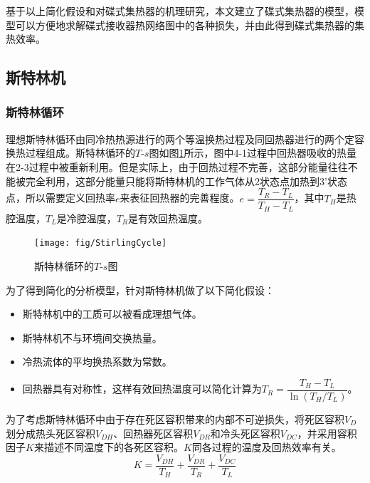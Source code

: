 基于以上简化假设和对碟式集热器的机理研究，本文建立了碟式集热器的模型，模型可以方便地求解碟式接收器热网络图中的各种损失，并由此得到碟式集热器的集热效率。

\subsection{斯特林机}
\label{sec:StirlingEngineModel}
\subsubsection{斯特林循环}
理想斯特林循环由同冷热热源进行的两个等温换热过程及同回热器进行的两个定容换热过程组成。斯特林循环的$T$-$s$图如图\ref{fig:StirlingCycle}所示，图中4-1过程中回热器吸收的热量在2-3过程中被重新利用。但是实际上，由于回热过程不完善，这部分能量往往不能被完全利用，这部分能量只能将斯特林机的工作气体从2状态点加热到3'状态点，所以需要定义回热率$e$来表征回热器的完善程度\cite{Formosa2010,Juhasz2010}。$e=\dfrac{T_R-T_L}{T_H-T_L}$，其中$T_H$是热腔温度，$T_L$是冷腔温度，$T_R$是有效回热温度。

\noindent \begin{figure}[htbp]
\begin{center}
	\texttt{[image: fig/StirlingCycle]}
	\caption{斯特林循环的$T$-$s$图}
	\label{fig:StirlingCycle}
\end{center}
\end{figure}

为了得到简化的分析模型，针对斯特林机做了以下简化假设：

\begin{itemize}
\item 斯特林机中的工质可以被看成理想气体。
\item 斯特林机不与环境间交换热量。
\item 冷热流体的平均换热系数为常数。
\item 回热器具有对称性，这样有效回热温度可以简化计算为$T_{R}=\dfrac{T_{H}-T_{L}}{\ln(T_{H}/T_{L})}$\cite{Formosa2010,Juhasz2010}。
\end{itemize}

为了考虑斯特林循环中由于存在死区容积带来的内部不可逆损失，将死区容积$V_D$划分成热头死区容积$V_{DH}$、回热器死区容积$V_{DR}$和冷头死区容积$V_{DC}$\cite{Duan2014}，并采用容积因子$K$来描述不同温度下的各死区容积。$K$同各过程的温度及回热效率有关。
\begin{equation}
	K = \frac{V_{DH}}{T_H} + \frac{V_{DR}}{T_R} + \frac{V_{DC}}{T_L}
\end{equation}

